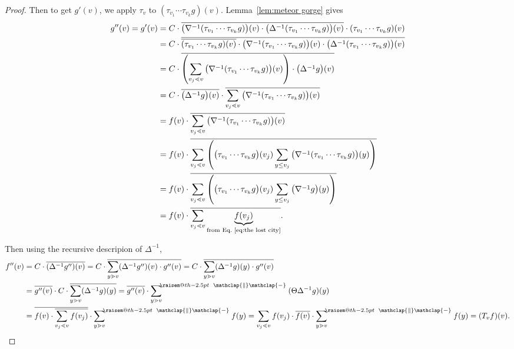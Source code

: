 \documentclass[ALCO,ThmDefs,Unicode,epreuves]{cedram}
\makeatletter
\newcommand{\raisemath}[1]{\mathpalette{\raisem@th{#1}}}
\newcommand{\raisem@th}[3]{\raisebox{#1}{$#2#3$}}
\def\parallelsum{\:\ \mathclap{\|}\mathclap{-}\ \:}
\newcommand{\sumparlimitlower}[1]{{\sum\limits_{#1}}^{\hspace{-3 pt}\raisemath{-2.5pt}{\parallelsum}}\hspace{-2.9pt}}
\newcommand{\down}{\nabla}
\newcommand{\up}{\Delta}
\makeatother
\begin{document}
\begin{proof}
Then to get $g'(v)$, we apply $\tau_v$ to $\left( \tau_{v_1} \cdots \tau_{v_k}g \right)(v)$. Lemma~\ref{lem:meteor gorge} gives
\begin{align*}
g''(v)=g'(v)&=
C\cdot \overline{\big(\down^{-1}( \tau_{v_1} \cdots \tau_{v_k}g)\big)(v)\cdot\big(\up^{-1}( \tau_{v_1} \cdots \tau_{v_k}g)\big)(v)}\cdot ( \tau_{v_1} \cdots \tau_{v_k}g)(v)
\\
&= C\cdot
\overline{\overline{( \tau_{v_1} \cdots \tau_{v_k}g)(v)}\cdot\big(\down^{-1}( \tau_{v_1} \cdots \tau_{v_k}g)\big)(v)\cdot\big(\up^{-1}( \tau_{v_1} \cdots \tau_{v_k}g)\big)(v)}
\\
&= C\cdot
\overline{\left(\sum\limits_{v_j\lessdot v}\big(\down^{-1}( \tau_{v_1} \cdots \tau_{v_k}g)\big)(v)\right)\cdot\big(\up^{-1}g\big)(v)}
\\
&=C\cdot \overline{\big(\up^{-1}g\big)(v)}\cdot
\overline{\sum\limits_{v_j\lessdot v}\big(\down^{-1}( \tau_{v_1} \cdots \tau_{v_k}g)\big)(v)}
\\
&=
f(v)\cdot
\overline{\sum\limits_{v_j\lessdot v}\big(\down^{-1}( \tau_{v_1} \cdots \tau_{v_k}g)\big)(v)}
\\
&=
f(v)\cdot
\overline{\sum\limits_{v_j\lessdot v}\left(\big(\tau_{v_1} \cdots \tau_{v_k}g\big)(v_j)
\sum\limits_{y\leq v_j}\big(\down^{-1}( \tau_{v_1} \cdots \tau_{v_k}g)\big)(y)\right)}
\\
&=
f(v)\cdot
\overline{\sum\limits_{v_j\lessdot v}\left(\big(\tau_{v_1} \cdots \tau_{v_k}g\big)(v_j)
\sum\limits_{y\leq v_j}\big(\down^{-1}g\big)(y)\right)}
\\
&=
f(v)\cdot
\overline{\sum\limits_{v_j\lessdot v}\underbrace{f(v_j)}_
\text{from Eq.~\eqref{eq:the lost city}}}.
\end{align*}

Then using the recursive descripion of $\up^{-1}$,
\begin{align*}
f''(v) &= C\cdot \overline{(\up^{-1}g'')(v)}
=
C\cdot \overline{\sum\limits_{y\gtrdot v}(\up^{-1}g'')(v)\cdot g''(v)}
=
C\cdot \overline{\sum\limits_{y\gtrdot v}(\up^{-1}g)(y)\cdot g''(v)}\\
&=
\overline{g''(v)}\cdot C\cdot \overline{\sum\limits_{y\gtrdot v}(\up^{-1}g)(y)}
=
\overline{g''(v)}\cdot \sumparlimitlower{y\gtrdot v}(\Theta\up^{-1}g)(y)
\\
&=
\overline{f(v)\cdot
\overline{\sum\limits_{v_j\lessdot v}f(v_j)}}\cdot \sumparlimitlower{y\gtrdot v}f(y)
=\sum\limits_{v_j\lessdot v}f(v_j) \cdot\overline{f(v)}\cdot
\sumparlimitlower{y\gtrdot v}f(y)
=
(T_v f)(v).
\end{align*}



\end{proof}
\end{document}
